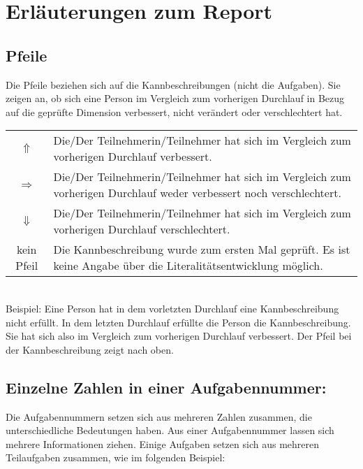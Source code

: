 \documentclass{article}
\begin{document}
\setlength{\fboxsep}{0pt}%

\section*{Erläuterungen zum Report}
\subsection*{Pfeile}
Die Pfeile beziehen sich auf die Kannbeschreibungen (nicht die Aufgaben). Sie zeigen an, ob sich eine Person im Vergleich zum vorherigen Durchlauf in Bezug auf die geprüfte Dimension verbessert, nicht verändert oder verschlechtert hat.
\vspace{.5em}\\
\begin{tabular}{cl}
$\Uparrow$ & Die/Der Teilnehmerin/Teilnehmer hat sich im Vergleich zum vorherigen Durchlauf verbessert.\\
$\Rightarrow$ & Die/Der Teilnehmerin/Teilnehmer hat sich im Vergleich zum vorherigen Durchlauf weder verbessert noch verschlechtert.\\
$\Downarrow$ & Die/Der Teilnehmerin/Teilnehmer hat sich im Vergleich zum vorherigen Durchlauf verschlechtert.\\
kein Pfeil & Die Kannbeschreibung wurde zum ersten Mal geprüft. Es ist keine Angabe über die Literalitätsentwicklung möglich.\\
\end{tabular}
\vspace{.5em}\\
\noindent Beispiel: Eine Person hat in dem vorletzten Durchlauf eine Kannbeschreibung nicht erfüllt. In dem letzten Durchlauf erfüllte die Person die Kannbeschreibung. Sie hat sich also im Vergleich zum vorherigen Durchlauf verbessert. Der Pfeil bei der Kannbeschreibung zeigt nach oben.


\subsection*{Einzelne Zahlen in einer Aufgabennummer:}
Die Aufgabennummern setzen sich aus mehreren Zahlen zusammen, die unterschiedliche Bedeutungen haben. Aus einer Aufgabennummer lassen sich mehrere Informationen ziehen. Einige Aufgaben setzen sich aus mehreren Teilaufgaben zusammen, wie im folgenden Beispiel:
\vspace{0.5em}\\
\end{document}
